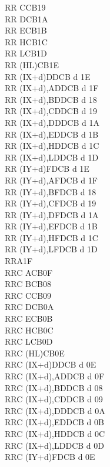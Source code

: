 \begin{multicols}{3}
{\begin{tabbing}
		RR C\>CB19\\
		RR D\>CB1A\\
		RR E\>CB1B\\
		RR H\>CB1C\\
		RR L\>CB1D\\
		RR (HL)\>CB1E\\
		RR (IX+d)\>DDCB d 1E\\
		RR (IX+d),A\UNDOC\>DDCB d 1F\\
		RR (IX+d),B\UNDOC\>DDCB d 18\\
		RR (IX+d),C\UNDOC\>DDCB d 19\\
		RR (IX+d),D\UNDOC\>DDCB d 1A\\
		RR (IX+d),E\UNDOC\>DDCB d 1B\\
		RR (IX+d),H\UNDOC\>DDCB d 1C\\
		RR (IX+d),L\UNDOC\>DDCB d 1D\\
		RR (IY+d)\>FDCB d 1E\\
		RR (IY+d),A\UNDOC\>FDCB d 1F\\
		RR (IY+d),B\UNDOC\>FDCB d 18\\
		RR (IY+d),C\UNDOC\>FDCB d 19\\
		RR (IY+d),D\UNDOC\>FDCB d 1A\\
		RR (IY+d),E\UNDOC\>FDCB d 1B\\
		RR (IY+d),H\UNDOC\>FDCB d 1C\\
		RR (IY+d),L\UNDOC\>FDCB d 1D\\
		RRA\>1F\\
		RRC A\>CB0F\\
		RRC B\>CB08\\
		RRC C\>CB09\\
		RRC D\>CB0A\\
		RRC E\>CB0B\\
		RRC H\>CB0C\\
		RRC L\>CB0D\\
		RRC (HL)\>CB0E\\
		RRC (IX+d)\>DDCB d 0E\\
		RRC (IX+d),A\UNDOC\>DDCB d 0F\\
		RRC (IX+d),B\UNDOC\>DDCB d 08\\
		RRC (IX+d),C\UNDOC\>DDCB d 09\\
		RRC (IX+d),D\UNDOC\>DDCB d 0A\\
		RRC (IX+d),E\UNDOC\>DDCB d 0B\\
		RRC (IX+d),H\UNDOC\>DDCB d 0C\\
		RRC (IX+d),L\UNDOC\>DDCB d 0D\\
		RRC (IY+d)\>FDCB d 0E\\

\end{tabbing}}
\end{multicols}
